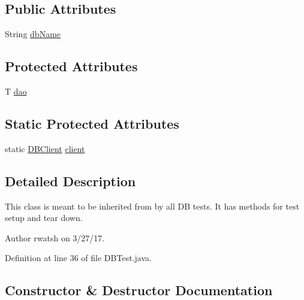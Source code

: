 \subsection*{Public Attributes}
\begin{DoxyCompactItemize}
\item 
String \hyperlink{classedu_1_1sjsu_1_1amigo_1_1user_1_1db_1_1test_1_1_d_b_test_a3f2573ce874e023900d80922923c6900}{db\+Name}
\end{DoxyCompactItemize}
\subsection*{Protected Attributes}
\begin{DoxyCompactItemize}
\item 
T \hyperlink{classedu_1_1sjsu_1_1amigo_1_1user_1_1db_1_1test_1_1_d_b_test_abe7d8e01886d915d725ff0cc9a971bba}{dao}
\end{DoxyCompactItemize}
\subsection*{Static Protected Attributes}
\begin{DoxyCompactItemize}
\item 
static \hyperlink{interfaceedu_1_1sjsu_1_1amigo_1_1db_1_1common_1_1_d_b_client}{D\+B\+Client} \hyperlink{classedu_1_1sjsu_1_1amigo_1_1user_1_1db_1_1test_1_1_d_b_test_a4d0a05dcef840b1759f95cb43bb1cb99}{client}
\end{DoxyCompactItemize}


\subsection{Detailed Description}
This class is meant to be inherited from by all DB tests. It has methods for test setup and tear down.

\begin{DoxyAuthor}{Author}
rwatsh on 3/27/17. 
\end{DoxyAuthor}


Definition at line 36 of file D\+B\+Test.\+java.



\subsection{Constructor \& Destructor Documentation}
\mbox{\label{classedu_1_1sjsu_1_1amigo_1_1user_1_1db_1_1test_1_1_d_b_test_a2bc89c29bb2b7a7ba50ce057c4da847e}} 
